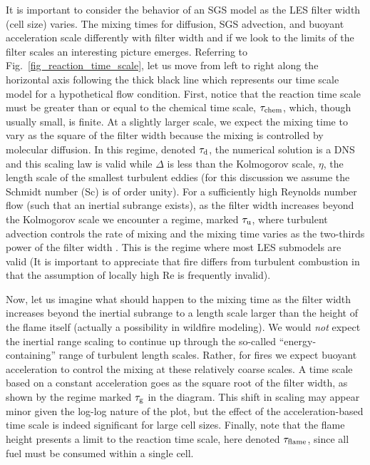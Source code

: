It is important to consider the behavior of an SGS model as the LES filter width (cell size) varies. The mixing times for diffusion, SGS advection, and buoyant acceleration scale differently with filter width and if we look to the limits of the filter scales an interesting picture emerges.  Referring to Fig.~\ref{fig_reaction_time_scale}, let us move from left to right along the horizontal axis following the thick black line which represents our time scale model for a hypothetical flow condition.  First, notice that the reaction time scale must be greater than or equal to the chemical time scale, $\tau_{\rm chem}$, which, though usually small, is finite. At a slightly larger scale, we expect the mixing time to vary as the square of the filter width because the mixing is controlled by molecular diffusion.  In this regime, denoted $\tau_{\rm d}$, the numerical solution is a DNS and this scaling law is valid while $\Delta$ is less than the Kolmogorov scale, $\eta$, the length scale of the smallest turbulent eddies (for this discussion we assume the Schmidt number (Sc) is of order unity). For a sufficiently high Reynolds number flow (such that an inertial subrange exists), as the filter width increases beyond the Kolmogorov scale we encounter a regime, marked $\tau_{\rm u}$, where turbulent advection controls the rate of mixing and the mixing time varies as the two-thirds power of the filter width \cite{Pope:2000}.  This is the regime where most LES submodels are valid (It is important to appreciate that fire differs from turbulent combustion in that the assumption of locally high Re is frequently invalid).

Now, let us imagine what should happen to the mixing time as the filter width increases beyond the inertial subrange to a length scale larger than the height of the flame itself (actually a possibility in wildfire modeling). We would \emph{not} expect the inertial range scaling to continue up through the so-called ``energy-containing'' range of turbulent length scales.  Rather, for fires we expect buoyant acceleration to control the mixing at these relatively coarse scales.  A time scale based on a constant acceleration goes as the square root of the filter width, as shown by the regime marked $\tau_{\rm g}$ in the diagram.  This shift in scaling may appear minor given the log-log nature of the plot, but the effect of the acceleration-based time scale is indeed significant for large cell sizes.  Finally, note that the flame height presents a limit to the reaction time scale, here denoted $\tau_{\rm flame}$, since all fuel must be consumed within a single cell.

